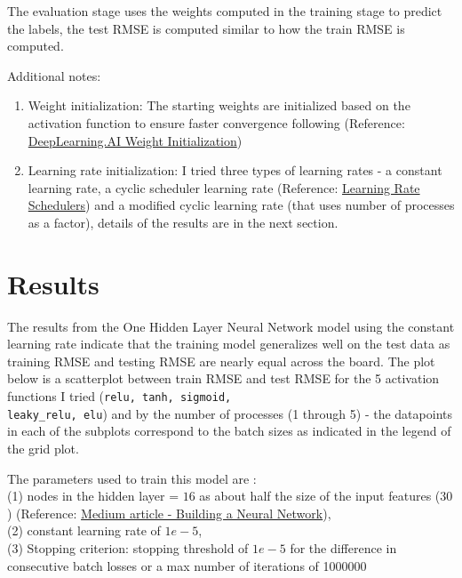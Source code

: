 \documentclass{article}
\begin{document}
The evaluation stage uses the weights computed in the training stage to predict the labels, the test RMSE is computed similar to how the train RMSE is computed. 

Additional notes:

\begin{enumerate}
    \item Weight initialization: The starting weights are initialized based on the activation function to ensure faster
    convergence following (Reference: \\ \href{https://www.deeplearning.ai/ai-notes/initialization/index.html}{DeepLearning.AI Weight Initialization})
    \item Learning rate initialization: I tried three types of learning rates - a constant learning rate, a cyclic scheduler learning rate (Reference: \href{https://machinelearningmastery.com/a-gentle-introduction-to-learning-rate-schedulers/}{Learning Rate Schedulers}) and a modified cyclic learning rate (that uses number of processes as a factor), details of the results are in the next section.
\end{enumerate}

\section{Results}
The results from the One Hidden Layer Neural Network model using the constant learning rate indicate that the training model generalizes well on the test data as training RMSE and testing RMSE are nearly equal across the board. The plot below is a scatterplot between train RMSE and test RMSE for the 5 activation functions I tried (\verb|relu, tanh, sigmoid,| \\ \verb|leaky_relu, elu|) and by the number of processes (1 through 5) - the datapoints in each of the subplots correspond to the batch sizes as indicated in the legend of the grid plot.

The parameters used to train this model are : \\
(1) nodes in the hidden layer = $16$ as about half the size of the input features ($30$) (Reference: \href{https://medium.com/data-science/17-rules-of-thumb-for-building-a-neural-network-93356f9930af}{Medium article - Building a Neural Network}), \\
(2) constant learning rate of $1e-5$, \\
(3) Stopping criterion: stopping threshold of $1e-5$ for the difference in consecutive batch losses or a max number of iterations of 1000000 \\
\end{document}
